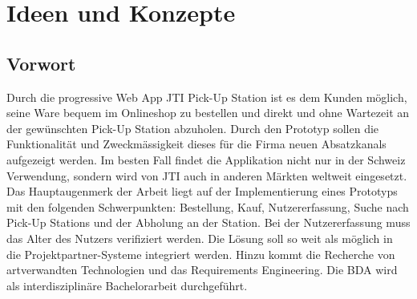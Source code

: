 \section{Ideen und Konzepte}
\subsection{Vorwort}
Durch die progressive Web App \ac{JTI} Pick-Up Station ist es dem Kunden möglich, seine Ware bequem im Onlineshop zu bestellen und direkt und ohne Wartezeit an der gewünschten Pick-Up Station abzuholen. Durch den Prototyp sollen die Funktionalität und Zweckmässigkeit dieses für die Firma neuen Absatzkanals aufgezeigt werden. Im besten Fall findet die Applikation nicht nur in der Schweiz Verwendung, sondern wird von \ac{JTI} auch in anderen Märkten weltweit eingesetzt. Das Hauptaugenmerk der Arbeit liegt auf der Implementierung eines Prototyps mit den folgenden Schwerpunkten: Bestellung, Kauf, Nutzererfassung, Suche nach Pick-Up Stations und der Abholung an der Station. Bei der Nutzererfassung muss das Alter des Nutzers verifiziert werden. Die Lösung soll so weit als möglich in die Projektpartner-Systeme integriert werden. Hinzu kommt die Recherche von artverwandten Technologien und das Requirements Engineering. Die BDA wird als interdisziplinäre Bachelorarbeit durchgeführt. 

